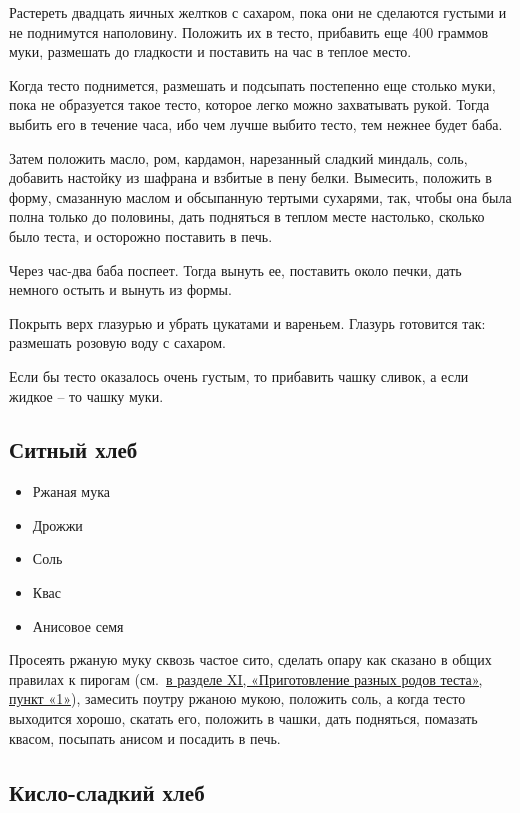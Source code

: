 Растереть двадцать яичных желтков с сахаром, пока они не сделаются густыми и не поднимутся наполовину. Положить их в тесто, прибавить еще 400 граммов муки, размешать до гладкости и поставить на час в теплое место.

Когда тесто поднимется, размешать и подсыпать постепенно еще столько муки, пока не образуется такое тесто, которое легко можно захватывать рукой. Тогда выбить его в течение часа, ибо чем лучше выбито тесто, тем нежнее будет баба.

Затем положить масло, ром, кардамон, нарезанный сладкий миндаль, соль, добавить настойку из шафрана и взбитые в пену белки. Вымесить, положить в форму, смазанную маслом и обсыпанную тертыми сухарями, так, чтобы она была полна только до половины, дать подняться в теплом месте настолько, сколько было теста, и осторожно поставить в печь.

Через час-два баба поспеет. Тогда вынуть ее, поставить около печки, дать немного остыть и вынуть из формы.

Покрыть верх глазурью и убрать цукатами и вареньем. Глазурь готовится так: размешать розовую воду с сахаром.

Если бы тесто оказалось очень густым, то прибавить чашку сливок, а если жидкое – то чашку муки.

\subsection{Ситный хлеб}

\begin{itemize}
	\item Ржаная мука 
    \item Дрожжи 
    \item Соль
    \item Квас
    \item Анисовое семя
\end{itemize}

Просеять ржаную муку сквозь частое сито, сделать опару как сказано в общих правилах к пирогам (см.~\hyperref[sub:drozhzhevoje]{в разделе XI, «Приготовление разных родов теста», пункт «1»}), замесить поутру ржаною мукою, положить соль, а когда тесто выходится хорошо, скатать его, положить в чашки, дать подняться, помазать квасом, посыпать анисом и посадить в печь.

\subsection{Кисло-сладкий хлеб}

